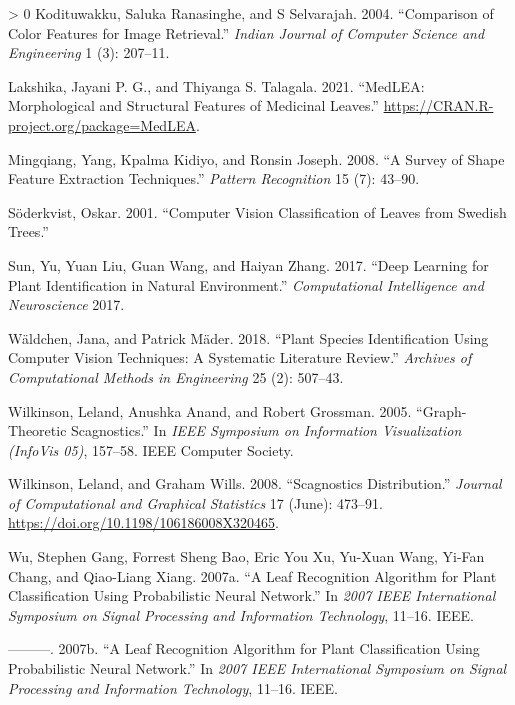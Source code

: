 \documentclass{article}
\newlength{\cslhangindent}
\newenvironment{CSLReferences}[3] %
 {%
  \setlength{\parindent}{0pt}
  \ifodd #1 \everypar{\setlength{\hangindent}{\cslhangindent}}\ignorespaces\fi
  \ifnum #2 > 0
  \setlength{\parskip}{#2\baselineskip}
  \fi
 }%
 {}
\begin{document}
\begin{CSLReferences}{1}{0}
\leavevmode\hypertarget{ref-colarticle1}{}%
Kodituwakku, Saluka Ranasinghe, and S Selvarajah. 2004. {``Comparison of
Color Features for Image Retrieval.''} \emph{Indian Journal of Computer
Science and Engineering} 1 (3): 207--11.

\leavevmode\hypertarget{ref-medlea}{}%
Lakshika, Jayani P. G., and Thiyanga S. Talagala. 2021. {``MedLEA:
Morphological and Structural Features of Medicinal Leaves.''}
\url{https://CRAN.R-project.org/package=MedLEA}.

\leavevmode\hypertarget{ref-article7}{}%
Mingqiang, Yang, Kpalma Kidiyo, and Ronsin Joseph. 2008. {``A Survey of
Shape Feature Extraction Techniques.''} \emph{Pattern Recognition} 15
(7): 43--90.

\leavevmode\hypertarget{ref-soderkvist2001computer}{}%
Söderkvist, Oskar. 2001. {``Computer Vision Classification of Leaves
from Swedish Trees.''}

\leavevmode\hypertarget{ref-sun2017deep}{}%
Sun, Yu, Yuan Liu, Guan Wang, and Haiyan Zhang. 2017. {``Deep Learning
for Plant Identification in Natural Environment.''} \emph{Computational
Intelligence and Neuroscience} 2017.

\leavevmode\hypertarget{ref-articlee}{}%
Wäldchen, Jana, and Patrick Mäder. 2018. {``Plant Species Identification
Using Computer Vision Techniques: A Systematic Literature Review.''}
\emph{Archives of Computational Methods in Engineering} 25 (2): 507--43.

\leavevmode\hypertarget{ref-inproceedings44}{}%
Wilkinson, Leland, Anushka Anand, and Robert Grossman. 2005.
{``Graph-Theoretic Scagnostics.''} In \emph{IEEE Symposium on
Information Visualization (InfoVis 05)}, 157--58. IEEE Computer Society.

\leavevmode\hypertarget{ref-article37}{}%
Wilkinson, Leland, and Graham Wills. 2008. {``Scagnostics
Distribution.''} \emph{Journal of Computational and Graphical
Statistics} 17 (June): 473--91.
\url{https://doi.org/10.1198/106186008X320465}.

\leavevmode\hypertarget{ref-4458016}{}%
Wu, Stephen Gang, Forrest Sheng Bao, Eric You Xu, Yu-Xuan Wang, Yi-Fan
Chang, and Qiao-Liang Xiang. 2007a. {``A Leaf Recognition Algorithm for
Plant Classification Using Probabilistic Neural Network.''} In
\emph{2007 IEEE International Symposium on Signal Processing and
Information Technology}, 11--16. IEEE.

\leavevmode\hypertarget{ref-wu2007leaf}{}%
---------. 2007b. {``A Leaf Recognition Algorithm for Plant
Classification Using Probabilistic Neural Network.''} In \emph{2007
{IEEE} International Symposium on Signal Processing and Information
Technology}, 11--16. IEEE.

\end{CSLReferences}



\end{document}
